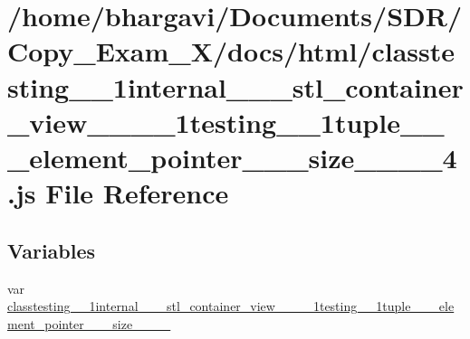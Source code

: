 \hypertarget{classtesting__1__1internal__1__1__stl__container__view__3__01__1__1testing__1__1tuple__3__01__elfa0bd59d1b1cbbf22427d0cc37724d83}{}\section{/home/bhargavi/\+Documents/\+S\+D\+R/\+Copy\+\_\+\+Exam\+\_\+X/docs/html/classtesting\+\_\+\_\+1internal\+\_\+\_\+\_\+stl\+\_\+container\+\_\+view\+\_\+\_\+\_\+\_\+1testing\+\_\+\_\+1tuple\+\_\+\_\+\_\+element\+\_\+pointer\+\_\+\_\+\_\+size\+\_\+\_\+\_\+\_\+4.js File Reference}
\label{classtesting__1__1internal__1__1__stl__container__view__3__01__1__1testing__1__1tuple__3__01__elfa0bd59d1b1cbbf22427d0cc37724d83}
\subsection*{Variables}
\begin{DoxyCompactItemize}
\item 
var \hyperlink{classtesting__1__1internal__1__1__stl__container__view__3__01__1__1testing__1__1tuple__3__01__elfa0bd59d1b1cbbf22427d0cc37724d83_a6c30da86fa4354dd4bf420a2772dacd1}{classtesting\+\_\+\_\+1internal\+\_\+\_\+\_\+stl\+\_\+container\+\_\+view\+\_\+\_\+\_\+\_\+1testing\+\_\+\_\+1tuple\+\_\+\_\+\_\+element\+\_\+pointer\+\_\+\_\+\_\+size\+\_\+\_\+\_\+\_}
\end{DoxyCompactItemize}


